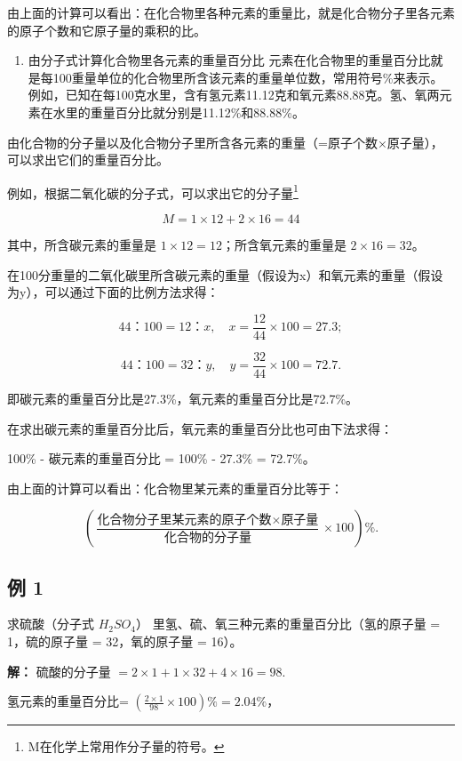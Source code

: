 由上面的计算可以看出：在化合物里各种元素的重量比，就是化合物分子里各元素的原子个数和它原子量的乘积的比。

\begin{enumerate}[start=2]
\item
  由分子式计算化合物里各元素的重量百分比
  元素在化合物里的重量百分比就是每100重量单位的化合物里所含该元素的重量单位数，常用符号\%来表示。例如，已知在每100克水里，含有氢元素11.12克和氧元素88.88克。氢、氧两元素在水里的重量百分比就分别是11.12\%和88.88\%。
\end{enumerate}

由化合物的分子量以及化合物分子里所含各元素的重量（=原子个数×原子量），可以求出它们的重量百分比。

例如，根据二氧化碳的分子式，可以求出它的分子量\footnote{M在化学上常用作分子量的符号。}

\[
M=1\times12+2\times16=44
\]

其中，所含碳元素的重量是 \(1 \times 12 = 12\)；所含氧元素的重量是
\(2 \times 16 = 32\)。

在100分重量的二氧化碳里所含碳元素的重量（假设为x）和氧元素的重量（假设为y），可以通过下面的比例方法求得：

\[
44\text{：}100 = 12\text{：}x, \quad x = \frac{12}{44}\times 100 = 27.3;
\]

\[
44\text{：}100 = 32\text{：}y, \quad y = \frac{32}{44}\times 100 = 72.7.
\]

即碳元素的重量百分比是27.3\%，氧元素的重量百分比是72.7\%。

在求出碳元素的重量百分比后，氧元素的重量百分比也可由下法求得：

100\% - 碳元素的重量百分比 = 100\% - 27.3\% = 72.7\%。

由上面的计算可以看出：化合物里某元素的重量百分比等于：

\[
\left(\frac {\text{化合物分子里某元素的原子个数} \times \text{原子量}}{\text{化合物的分子量}} \times 100\right) \% .
\]

\subsection{例 1}

求硫酸（分子式 \(H_{2}SO_{4}\)）
里氢、硫、氧三种元素的重量百分比（氢的原子量 = 1，硫的原子量 =
32，氧的原子量 = 16）。

\textbf{解：} 硫酸的分子量
\(= 2 \times 1 + 1 \times 32 + 4 \times 16 = 98.\)

氢元素的重量百分比=
\(\left(\frac{2\times1}{98}\times100\right)\%=2.04\%\)，

